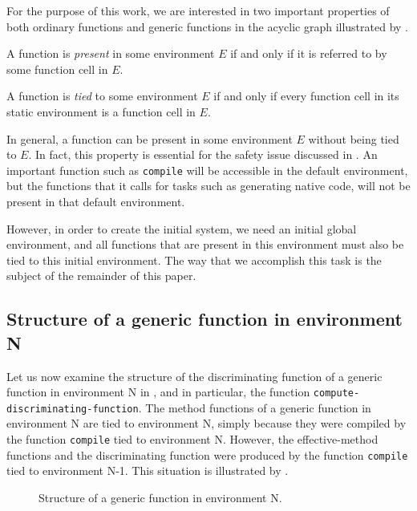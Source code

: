 For the purpose of this work, we are interested in two important
properties of both ordinary functions and generic functions in the
acyclic graph illustrated by .

\begin{definition}
A function is \emph{present} in some environment $E$ if and only if it
is referred to by some function cell in $E$.
\end{definition}

\begin{definition}
A function is \emph{tied} to some environment $E$ if and only if every
function cell in its static environment is a function cell in $E$.
\end{definition}

In general, a function can be present in some environment $E$ without
being tied to $E$.  In fact, this property is essential for the safety
issue discussed in .  An
important function such as \texttt{compile} will be accessible in the
default environment, but the functions that it calls for tasks such as
generating native code, will not be present in that default
environment.

However, in order to create the initial \sicl{} system, we need an
initial global environment, and all functions that are present in this
environment must also be tied to this initial environment.  The way
that we accomplish this task is the subject of the remainder of this
paper.

\subsection{Structure of a generic function in environment N}

Let us now examine the structure of the discriminating function of a
generic function in environment N in , and
in particular, the function \texttt{compute-discriminating-function}.
The method functions of a generic function in environment N are tied
to environment N, simply because they were compiled by the function
\texttt{compile} tied to environment N.  However, the effective-method
functions and the discriminating function were produced by the
function \texttt{compile} tied to environment N-1.  This situation is
illustrated by .

\begin{figure}
\begin{center}
\end{center}
\caption{\label{fig-structure-of-generic-function}
Structure of a generic function in environment N.}
\end{figure}

